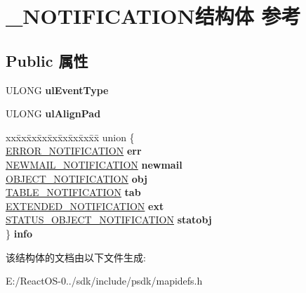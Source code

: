 \hypertarget{struct___n_o_t_i_f_i_c_a_t_i_o_n}{}\section{\+\_\+\+N\+O\+T\+I\+F\+I\+C\+A\+T\+I\+O\+N结构体 参考}
\label{struct___n_o_t_i_f_i_c_a_t_i_o_n}
\subsection*{Public 属性}
\begin{DoxyCompactItemize}
\item 
\mbox{\label{struct___n_o_t_i_f_i_c_a_t_i_o_n_a76d361bf0f8a597bc6fd6b152c34897e}} 
U\+L\+O\+NG {\bfseries ul\+Event\+Type}
\item 
\mbox{\label{struct___n_o_t_i_f_i_c_a_t_i_o_n_a06c520ba0ca313dffa0e0848477fdabe}} 
U\+L\+O\+NG {\bfseries ul\+Align\+Pad}
\item 
\mbox{\label{struct___n_o_t_i_f_i_c_a_t_i_o_n_abd83d928dd88d1dcb1c629352071015e}} 
\begin{tabbing}
xx\=xx\=xx\=xx\=xx\=xx\=xx\=xx\=xx\=\kill
union \{\\
\>\hyperlink{struct___e_r_r_o_r___n_o_t_i_f_i_c_a_t_i_o_n}{ERROR\_NOTIFICATION} {\bfseries err}\\
\>\hyperlink{struct___n_e_w_m_a_i_l___n_o_t_i_f_i_c_a_t_i_o_n}{NEWMAIL\_NOTIFICATION} {\bfseries newmail}\\
\>\hyperlink{struct___o_b_j_e_c_t___n_o_t_i_f_i_c_a_t_i_o_n}{OBJECT\_NOTIFICATION} {\bfseries obj}\\
\>\hyperlink{struct___t_a_b_l_e___n_o_t_i_f_i_c_a_t_i_o_n}{TABLE\_NOTIFICATION} {\bfseries tab}\\
\>\hyperlink{struct___e_x_t_e_n_d_e_d___n_o_t_i_f_i_c_a_t_i_o_n}{EXTENDED\_NOTIFICATION} {\bfseries ext}\\
\>\hyperlink{struct_s_t_a_t_u_s___o_b_j_e_c_t___n_o_t_i_f_i_c_a_t_i_o_n}{STATUS\_OBJECT\_NOTIFICATION} {\bfseries statobj}\\
\} {\bfseries info}\\

\end{tabbing}\end{DoxyCompactItemize}


该结构体的文档由以下文件生成\+:\begin{DoxyCompactItemize}
\item 
E\+:/\+React\+O\+S-\/0../sdk/include/psdk/mapidefs.\+h\end{DoxyCompactItemize}
